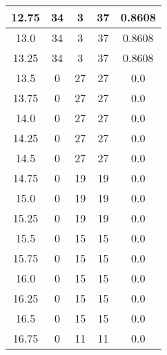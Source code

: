 \documentclass[letterpaper, 12pt]{article}
\begin{document}
\begin{longtable}{|c|c|c|c|c|}
\hline
12.75 & 34 & 3 & 37 & 0.8608 \\
\hline
13.0 & 34 & 3 & 37 & 0.8608 \\
\hline
13.25 & 34 & 3 & 37 & 0.8608 \\
\hline
13.5 & 0 & 27 & 27 & 0.0 \\
\hline
13.75 & 0 & 27 & 27 & 0.0 \\
\hline
14.0 & 0 & 27 & 27 & 0.0 \\
\hline
14.25 & 0 & 27 & 27 & 0.0 \\
\hline
14.5 & 0 & 27 & 27 & 0.0 \\
\hline
14.75 & 0 & 19 & 19 & 0.0 \\
\hline
15.0 & 0 & 19 & 19 & 0.0 \\
\hline
15.25 & 0 & 19 & 19 & 0.0 \\
\hline
15.5 & 0 & 15 & 15 & 0.0 \\
\hline
15.75 & 0 & 15 & 15 & 0.0 \\
\hline
16.0 & 0 & 15 & 15 & 0.0 \\
\hline
16.25 & 0 & 15 & 15 & 0.0 \\
\hline
16.5 & 0 & 15 & 15 & 0.0 \\
\hline
16.75 & 0 & 11 & 11 & 0.0 \\
\hline
\end{longtable}
\end{document}
